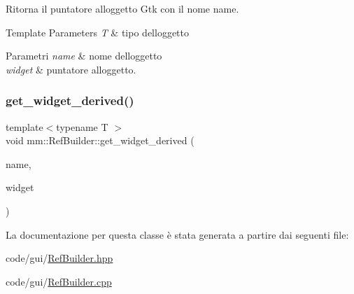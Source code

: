 Ritorna il puntatore all\textquotesingle{}oggetto Gtk con il nome name. 
\begin{DoxyTemplParams}{Template Parameters}
{\em T} & tipo dell\textquotesingle{}oggetto \\
\hline
\end{DoxyTemplParams}

\begin{DoxyParams}{Parametri}
{\em name} & nome dell\textquotesingle{}oggetto \\
\hline
{\em widget} & puntatore all\textquotesingle{}oggetto. \\
\hline
\end{DoxyParams}
\mbox{\label{classmm_1_1_ref_builder_a428724036811e6b9ecc6c50c42209a74}} 
\subsubsection{\texorpdfstring{get\+\_\+widget\+\_\+derived()}{get\_widget\_derived()}}
{\footnotesize\ttfamily template$<$typename T $>$ \\
void mm\+::\+Ref\+Builder\+::get\+\_\+widget\+\_\+derived (\begin{DoxyParamCaption}\item[{const Glib\+::ustring \&}]{name,  }\item[{T \&}]{widget }\end{DoxyParamCaption})\hspace{0.3cm}{\ttfamily [inline]}}



La documentazione per questa classe è stata generata a partire dai seguenti file\+:\begin{DoxyCompactItemize}
\item 
code/gui/\mbox{\hyperlink{_ref_builder_8hpp}{Ref\+Builder.\+hpp}}\item 
code/gui/\mbox{\hyperlink{_ref_builder_8cpp}{Ref\+Builder.\+cpp}}\end{DoxyCompactItemize}
